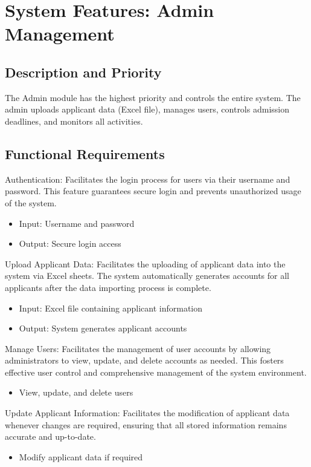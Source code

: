 \section{System Features: Admin Management}

\subsection{Description and Priority}
The Admin module has the highest priority and controls the entire system. The admin uploads applicant data (Excel file), manages users, controls admission deadlines, and monitors all activities.

\subsection{Functional Requirements}

\noindent Authentication:
Facilitates the login process for users via their username and password. This feature guarantees secure login and prevents unauthorized usage of the system.
\begin{itemize}
    \item Input: Username and password
    \item Output: Secure login access
\end{itemize}

\vspace{0.2cm}
\noindent Upload Applicant Data:
Facilitates the uploading of applicant data into the system via Excel sheets. The system automatically generates accounts for all applicants after the data importing process is complete.
\begin{itemize}
    \item Input: Excel file containing applicant information
    \item Output: System generates applicant accounts
\end{itemize}

\vspace{0.2cm}
\noindent Manage Users:
Facilitates the management of user accounts by allowing administrators to view, update, and delete accounts as needed. This fosters effective user control and comprehensive management of the system environment.
\begin{itemize}
    \item View, update, and delete users
\end{itemize}

\vspace{0.2cm}
\noindent Update Applicant Information:
Facilitates the modification of applicant data whenever changes are required, ensuring that all stored information remains accurate and up-to-date.
\begin{itemize}
    \item Modify applicant data if required
\end{itemize}

